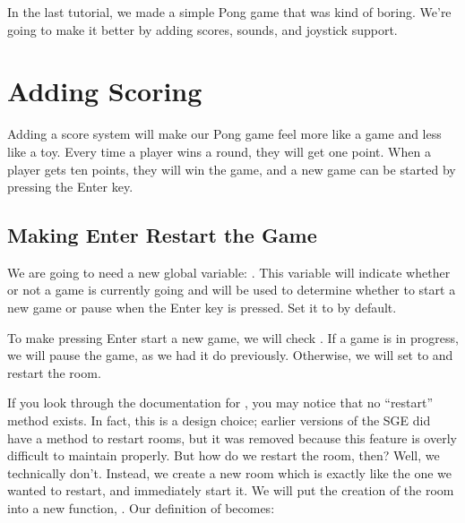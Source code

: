 \documentclass[letterpaper,10pt,english]{sphinxmanual}
\begin{document}
In the last tutorial, we made a simple Pong game that was kind of
boring.  We're going to make it better by adding scores, sounds, and
joystick support.


\section{Adding Scoring}
\label{pong_better:adding-scoring}
Adding a score system will make our Pong game feel more like a game and
less like a toy.  Every time a player wins a round, they will get one
point.  When a player gets ten points, they will win the game, and a new
game can be started by pressing the Enter key.


\subsection{Making Enter Restart the Game}
\label{pong_better:making-enter-restart-the-game}
We are going to need a new global variable: .
This variable will indicate whether or not a game is currently going and
will be used to determine whether to start a new game or pause when the
Enter key is pressed.  Set it to  by default.

To make pressing Enter start a new game, we will check
.  If a game is in progress, we will pause the
game, as we had it do previously.  Otherwise, we will set
 to  and restart the room.

If you look through the documentation for {\hyperref[dsp:sge.dsp.Room]{\emph{}}}, you may
notice that no ``restart'' method exists. In fact, this is a design
choice; earlier versions of the SGE did have a method to restart rooms,
but it was removed because this feature is overly difficult to maintain
properly.  But how do we restart the room, then? Well, we technically
don't.  Instead, we create a new room which is exactly like the one we
wanted to restart, and immediately start it.  We will put the creation
of the room into a new function, .  Our definition of
 becomes:
\end{document}

